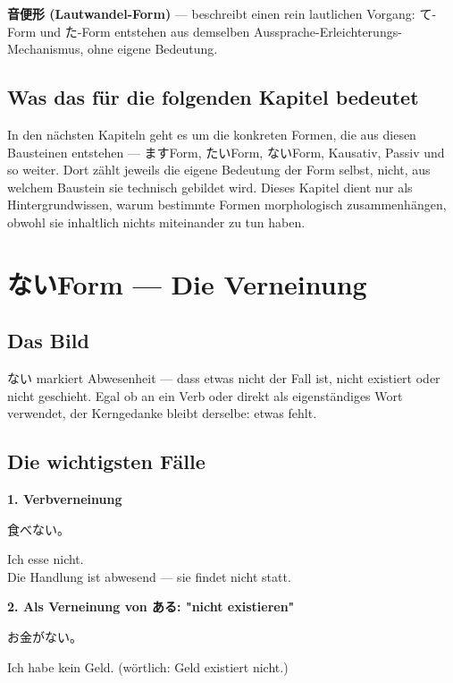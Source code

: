 \documentclass[12pt]{book}
\begin{document}
\textbf{音便形 (Lautwandel-Form)} — beschreibt einen rein lautlichen Vorgang: て-Form und た-Form entstehen aus demselben Aussprache-Erleichterungs-Mechanismus, ohne eigene Bedeutung.

\section*{Was das für die folgenden Kapitel bedeutet}

In den nächsten Kapiteln geht es um die konkreten Formen, die aus diesen Bausteinen entstehen — ますForm, たいForm, ないForm, Kausativ, Passiv und so weiter. Dort zählt jeweils die eigene Bedeutung der Form selbst, nicht, aus welchem Baustein sie technisch gebildet wird. Dieses Kapitel dient nur als Hintergrundwissen, warum bestimmte Formen morphologisch zusammenhängen, obwohl sie inhaltlich nichts miteinander zu tun haben.


\chapter{ないForm — Die Verneinung}

\section*{Das Bild}

ない markiert Abwesenheit — dass etwas nicht der Fall ist, nicht existiert oder nicht geschieht. Egal ob an ein Verb oder direkt als eigenständiges Wort verwendet, der Kerngedanke bleibt derselbe: etwas fehlt.

\section*{Die wichtigsten Fälle}

\textbf{1. Verbverneinung}
\par\quad 食べない。\\
\par\quad Ich esse nicht.\\

Die Handlung ist abwesend — sie findet nicht statt.

\textbf{2. Als Verneinung von ある: "nicht existieren"}
\par\quad お金がない。\\
\par\quad Ich habe kein Geld. (wörtlich: Geld existiert nicht.)\\
\end{document}
